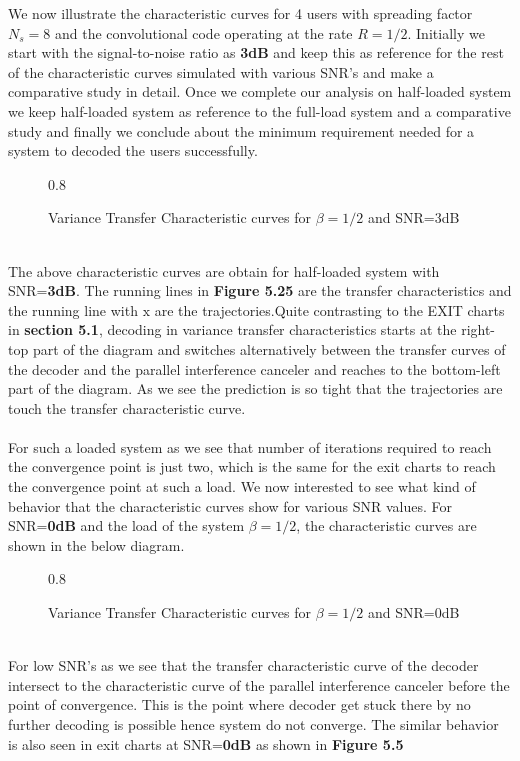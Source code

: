 \newpage
We now illustrate the characteristic curves for 4 users with spreading factor $N_s=8$ and the convolutional code operating at the rate $R=1/2$. Initially we start with the signal-to-noise ratio as \textbf{3dB} and keep this as reference for the rest of the characteristic curves simulated with various SNR's and make a comparative study in detail. Once we complete our analysis on half-loaded system we keep half-loaded system as reference to the full-load system and a comparative study and finally we conclude about the minimum requirement needed for a system to decoded the users successfully.
\begin{figure}[htb]
\centerline{  {0.8} }
\caption{Variance Transfer Characteristic curves for $\beta=1/2$ and SNR=3dB}
\end{figure}\\
The above characteristic curves are obtain for half-loaded system with SNR=\textbf{3dB}. The running lines in \textbf{Figure 5.25} are the transfer characteristics and the running line with $\mathrm{x}$ are the trajectories.Quite contrasting to the EXIT charts in \textbf{section 5.1}, decoding in variance transfer characteristics starts at the right-top part of the diagram and switches alternatively between the transfer curves of the decoder and the parallel interference canceler and reaches to the bottom-left part of the diagram. As we see the prediction is so tight that the trajectories are touch the transfer characteristic curve. \\ \\
For such a loaded system as we see that number of iterations required to reach the convergence point is just two, which is the same for the exit charts to reach the convergence point at such a load. We now interested to see what kind of behavior that the characteristic curves show for various SNR values.
\newpage
For SNR=\textbf{0dB} and the load of the system $\beta=1/2$, the characteristic curves are shown in the below diagram.
\begin{figure}[htb]
\centerline{  {0.8} }
\caption{Variance Transfer Characteristic curves for $\beta=1/2$ and SNR=0dB}
\end{figure}\\
For low SNR's as we see that the transfer characteristic curve of the decoder intersect to the characteristic curve of the parallel interference canceler before the point of convergence. This is the point where decoder get stuck there by no further decoding is possible hence system do not converge. The similar behavior is also seen in exit charts at SNR=\textbf{0dB} as shown in \textbf{Figure 5.5}\\ \\
